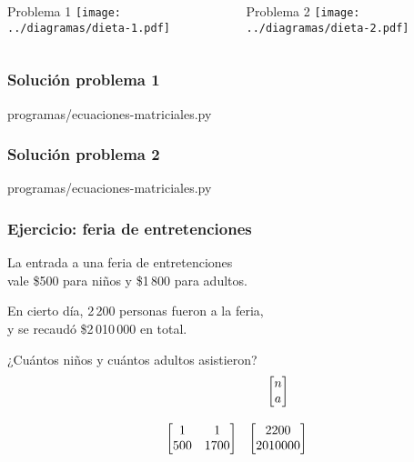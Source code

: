 \documentclass[12pt]{beamer}
\begin{document}
  \begin{frame}
    \label{diagramas-dieta}
    \begin{columns}
        \begin{block}{Problema 1}
          \vspace{2ex}
          \texttt{[image: ../diagramas/dieta-1.pdf]}
        \end{block}
        \begin{block}{Problema 2}
          \vspace{2ex}
          \texttt{[image: ../diagramas/dieta-2.pdf]}
        \end{block}
    \end{columns}
  \end{frame}

  \begin{frame}
    \label{solucion-nutrientes}
    \frametitle{Solución problema 1}
    
        {programas/ecuaciones-matriciales.py}
  \end{frame}

  \begin{frame}
    \label{solucion-alimentos}
    \frametitle{Solución problema 2}
    
        {programas/ecuaciones-matriciales.py}
  \end{frame}

  \begin{frame}
    \label{enunciado-feria}
    \frametitle{Ejercicio: feria de entretenciones}
    La entrada a una feria de entretenciones \\
    vale \$500 para niños y \$1\,800 para adultos.
    \vspace{2ex}

    En cierto día,
    2\,200 personas fueron a la feria, \\
    y se recaudó \$2\,010\,000 en total.
    \vspace{2ex}

    ¿Cuántos niños y cuántos adultos asistieron?
    \pause
    \[
      \begin{array}{cc}
        &
        \begin{bmatrix} n \\ a \\ \end{bmatrix} \vspace{3ex} \\
        \begin{bmatrix} 1 & 1 \\ 500 & 1700 \\ \end{bmatrix} &
        \begin{bmatrix} 2200  \\ 2010000    \\ \end{bmatrix}
      \end{array}
    \]
  \end{frame}
\end{document}
